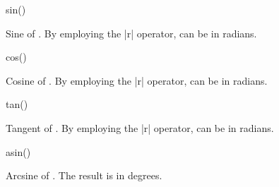 \begin{math-function}{sin()}

	Sine of . By employing the |r| operator,  can be in 
	radians.
	
\begin{codeexample}[post=\tt\footnotesize\pgfmathresult]
\end{codeexample}

\begin{codeexample}[post=\tt\footnotesize\pgfmathresult]
\end{codeexample}

\end{math-function}

\begin{math-function}{cos()}

	Cosine of . By employing the |r| operator,  can be in 
	radians.

\begin{codeexample}[post=\tt\footnotesize\pgfmathresult]
\end{codeexample}

\begin{codeexample}[post=\tt\footnotesize\pgfmathresult]
\end{codeexample}

\end{math-function}

\begin{math-function}{tan()}

	Tangent of . By employing the |r| operator,  can be in 
	radians.
	
\begin{codeexample}[post=\tt\footnotesize\pgfmathresult]
\end{codeexample}

\begin{codeexample}[post=\tt\footnotesize\pgfmathresult]
\end{codeexample}

\end{math-function}

\begin{math-function}{asin()}

	Arcsine of . The result is in degrees.

\begin{codeexample}[post=\tt\footnotesize\pgfmathresult]
\end{codeexample}

\end{math-function}

